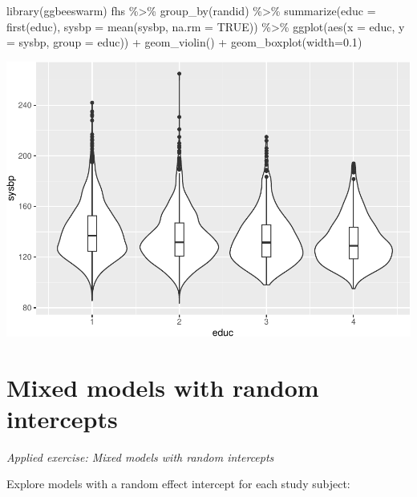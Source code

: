 \documentclass[
]{book}
\newenvironment{Shaded}{\begin{snugshade}}{\end{snugshade}}
\newcommand{\AttributeTok}[1]{\textcolor[rgb]{0.77,0.63,0.00}{#1}}
\newcommand{\ConstantTok}[1]{\textcolor[rgb]{0.00,0.00,0.00}{#1}}
\newcommand{\FloatTok}[1]{\textcolor[rgb]{0.00,0.00,0.81}{#1}}
\newcommand{\FunctionTok}[1]{\textcolor[rgb]{0.00,0.00,0.00}{#1}}
\newcommand{\NormalTok}[1]{#1}
\newcommand{\SpecialCharTok}[1]{\textcolor[rgb]{0.00,0.00,0.00}{#1}}
\begin{document}
\begin{Shaded}
\begin{Highlighting}[]
\FunctionTok{library}\NormalTok{(ggbeeswarm)}
\NormalTok{fhs }\SpecialCharTok{\%\textgreater{}\%} 
  \FunctionTok{group\_by}\NormalTok{(randid) }\SpecialCharTok{\%\textgreater{}\%} 
  \FunctionTok{summarize}\NormalTok{(}\AttributeTok{educ =} \FunctionTok{first}\NormalTok{(educ), }
            \AttributeTok{sysbp =} \FunctionTok{mean}\NormalTok{(sysbp, }\AttributeTok{na.rm =} \ConstantTok{TRUE}\NormalTok{)) }\SpecialCharTok{\%\textgreater{}\%} 
  \FunctionTok{ggplot}\NormalTok{(}\FunctionTok{aes}\NormalTok{(}\AttributeTok{x =}\NormalTok{ educ, }\AttributeTok{y =}\NormalTok{ sysbp, }\AttributeTok{group =}\NormalTok{ educ)) }\SpecialCharTok{+} 
  \FunctionTok{geom\_violin}\NormalTok{() }\SpecialCharTok{+} 
  \FunctionTok{geom\_boxplot}\NormalTok{(}\AttributeTok{width=}\FloatTok{0.1}\NormalTok{)}
\end{Highlighting}
\end{Shaded}

\includegraphics{adv_epi_analysis_files/figure-latex/unnamed-chunk-287-1.pdf}

\hypertarget{mixed-models-with-random-intercepts}{%
\section{Mixed models with random intercepts}\label{mixed-models-with-random-intercepts}}

\emph{Applied exercise: Mixed models with random intercepts}

Explore models with a random effect intercept for each study subject:
\end{document}
